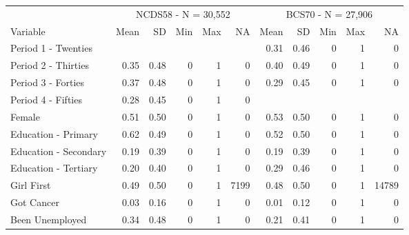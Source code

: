
\begin{tabular}{lrrrrrrrrrr}
\toprule
\multicolumn{1}{c}{} & \multicolumn{5}{c}{NCDS58 - N = 30,552} & \multicolumn{5}{c}{BCS70 - N = 27,906} \\
\cmidrule(l{3pt}r{3pt}){2-6} \cmidrule(l{3pt}r{3pt}){7-11}
Variable & Mean & SD & Min & Max & NA & Mean & SD & Min & Max & NA\\
\midrule
Period 1 - Twenties &  &  &  &  &  & 0.31 & 0.46 & 0 & 1 & 0\\
Period 2 - Thirties & 0.35 & 0.48 & 0 & 1 & 0 & 0.40 & 0.49 & 0 & 1 & 0\\
Period 3 - Forties & 0.37 & 0.48 & 0 & 1 & 0 & 0.29 & 0.45 & 0 & 1 & 0\\
Period 4 - Fifties & 0.28 & 0.45 & 0 & 1 & 0 &  &  &  &  & \\
Female & 0.51 & 0.50 & 0 & 1 & 0 & 0.53 & 0.50 & 0 & 1 & 0\\
Education - Primary & 0.62 & 0.49 & 0 & 1 & 0 & 0.52 & 0.50 & 0 & 1 & 0\\
Education - Secondary & 0.19 & 0.39 & 0 & 1 & 0 & 0.19 & 0.39 & 0 & 1 & 0\\
Education - Tertiary & 0.20 & 0.40 & 0 & 1 & 0 & 0.29 & 0.46 & 0 & 1 & 0\\
Girl First & 0.49 & 0.50 & 0 & 1 & 7199 & 0.48 & 0.50 & 0 & 1 & 14789\\
Got Cancer & 0.03 & 0.16 & 0 & 1 & 0 & 0.01 & 0.12 & 0 & 1 & 0\\
Been Unemployed & 0.34 & 0.48 & 0 & 1 & 0 & 0.21 & 0.41 & 0 & 1 & 0\\
\bottomrule
\end{tabular}

